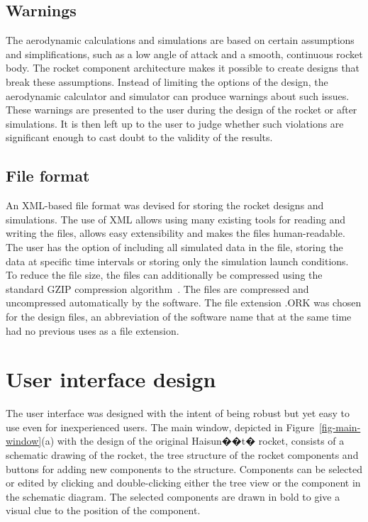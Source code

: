 \subsection{Warnings}
\label{sec-warnings}

The aerodynamic calculations and simulations are based on certain
assumptions and simplifications, such as a low angle of attack and a
smooth, continuous rocket body.  The rocket component architecture
makes it possible to create designs that break these assumptions.
Instead of limiting the options of the design, the aerodynamic
calculator and simulator can produce warnings about such issues.
These warnings are presented to the user during the design of the
rocket or after simulations.  It is then left up to the user to judge
whether such violations are significant enough to cast doubt to the
validity of the results.


\subsection{File format}

An XML-based file format was devised for storing the rocket designs
and simulations.  The use of XML allows using many existing tools for
reading and writing the files, allows easy extensibility and makes the
files human-readable.  The user has the option of including all
simulated data in the file, storing the data at specific time
intervals or storing only the simulation launch conditions.  To reduce
the file size, the files can additionally be compressed using the
standard GZIP compression algorithm~\cite{GZIP}.  The files are
compressed and uncompressed automatically by the software.  The file
extension .ORK was chosen for the design files, an abbreviation of the
software name that at the same time had no previous uses as a file
extension.





\section{User interface design}

The user interface was designed with the intent of being robust but
yet easy to use even for inexperienced users.  The main window,
depicted in Figure~\ref{fig-main-window}(a) with the design of the
original Haisun��t� rocket, consists of a schematic drawing of the
rocket, the tree structure of the rocket components and
buttons for adding new components to the structure. Components can
be selected or edited by clicking and double-clicking either the tree
view or the component in the schematic diagram.  The selected
components are drawn in bold to give a visual clue to the position
of the component.

